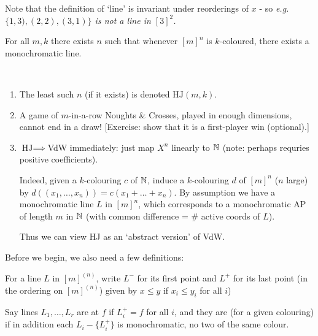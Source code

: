 \documentclass[10pt]{article}
\newcommand{\hj}{\textrm{HJ}}
\begin{document}
Note that the definition of `line' is invariant under reorderings of $x$ - so \it{e.g.} $\{1,3),(2,2),(3,1)\}$ is \it{not} a line in $[3]^{2}$.

\begin{theorem}
    For all $m,k$ there exists $n$ such that whenever $[m]^{n}$ is $k$-coloured, there exists a monochromatic line.
\end{theorem}
\begin{remark*}[Remarks]\ 
    \begin{enumerate}
        \item The least such $n$ (if it exists) is denoted $\hj(m,k)$.
        \item A game of $m$-in-a-row Noughts \& Crosses, played in enough dimensions, cannot end in a draw! [Exercise: show that it is a first-player win (optional).]
        \item $\hj\implies$VdW immediately: just map $X^n$ linearly to $\mathbb{N}$ (note: perhaps requries positive coefficients).
        
        Indeed, given a $k$-colouring $c$ of $\mathbb{N}$, induce a $k$-colouring $d$ of $[m]^n$ ($n$ large) by $d((x_1,\dots,x_n)) = c(x_1+\dots+x_n)$. By assumption we have a monochromatic line $L$ in $[m]^{n}$, which corresponds to a monochromatic AP of length $m$ in $\mathbb{N}$ (with common difference = \# active coords of $L$).

        Thus we can view HJ as an `abstract version' of VdW.
    \end{enumerate}
\end{remark*}

Before we begin, we also need a few definitions:

For a line $L$ in $[m]^{(n)}$, write $L^-$ for its first point and $L^+$ for its last point (in the ordering on $[m]^{(n)}$) given by $x \le y$ if $x_i \le y_i$ for all $i$)

Say lines $L_1,\dots,L_r$ are  at $f$ if $L_i^+ = f$ for all $i$, and they are  (for a given colouring) if in addition each $L_i - \{L_i^+\}$ is monochromatic, no two of the same colour.
\end{document}
